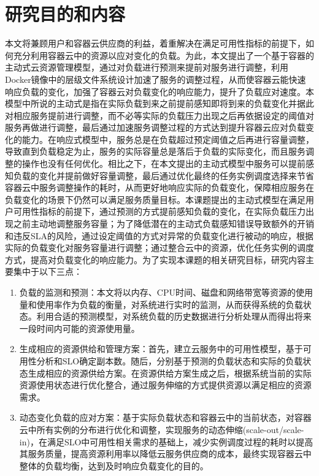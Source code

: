 \section{研究目的和内容}
本文将兼顾用户和容器云供应商的利益，着重解决在满足可用性指标的前提下，如何充分利用容器云中的资源以应对变化的负载。为此，本文提出了一个基于容器的主动式云资源管理模型，通过对负载进行预测来提前对服务进行调整，利用Docker镜像中的层级文件系统设计加速了服务的调整过程，从而使容器云能快速响应负载的变化，加强了容器云对负载变化的响应能力，提升了负载应对速度。本模型中所说的主动式是指在实际负载到来之前提前感知即将到来的负载变化并据此对相应服务提前进行调整，而不必等实际的负载压力出现之后再依据设定的阈值对服务再做进行调整，最后通过加速服务调整过程的方式达到提升容器云应对负载变化的能力。在响应式模型中，服务总是在负载超过预定阈值之后再进行容量调整，导致直到负载稳定为止，服务的实际容量总是落后于负载的实际变化，而且服务调整的操作也没有任何优化。相比之下，在本文提出的主动式模型中服务可以提前感知负载的变化并提前做好容量调整，最后通过优化最终的任务实例调度选择来节省容器云中服务调整操作的耗时，从而更好地响应实际的负载变化，保障相应服务在负载变化的场景下仍然可以满足服务质量目标。本课题提出的主动式模型在满足用户可用性指标的前提下，通过预测的方式提前感知负载的变化，在实际负载压力出现之前主动地调整服务容量；为了降低潜在的主动式负载感知错误导致额外的开销和违反SLA的风险，通过设定阈值的方式对异常的负载变化进行被动的响应，根据实际的负载变化对服务容量进行调整；通过整合云中的资源，优化任务实例的调度方式，提高对负载变化的响应能力。为了实现本课题的相关研究目标，研究内容主要集中于以下三点：
\begin{enumerate}
\item 负载的监测和预测：本文将以内存、CPU时间、磁盘和网络带宽等资源的使用量和使用率作为负载的衡量，对系统进行实时的监测，从而获得系统的负载状态。利用合适的预测模型，对系统负载的历史数据进行分析处理从而得出将来一段时间内可能的资源使用量。
\item 生成相应的资源供给和管理方案：首先，建立云服务中的可用性模型，基于可用性分析和SLO确定副本数。随后，分别基于预测的负载状态和实际的负载状态生成相应的资源供给方案。在资源供给方案生成之后，根据系统当前的实际资源使用状态进行优化整合，通过服务伸缩的方式提供资源以满足相应的资源需求。
\item 动态变化负载的应对方案：基于实际负载状态和容器云中的当前状态，对容器云中所有实例的分布进行优化和调整，实现服务的动态伸缩(scale-out/scale-in)，在满足SLO中可用性相关需求的基础上，减少实例调度过程的耗时以提高其服务质量，提高资源利用率以降低云服务供应商的成本，最终实现容器云中整体的负载均衡，达到及时响应负载变化的目的。
\end{enumerate}

